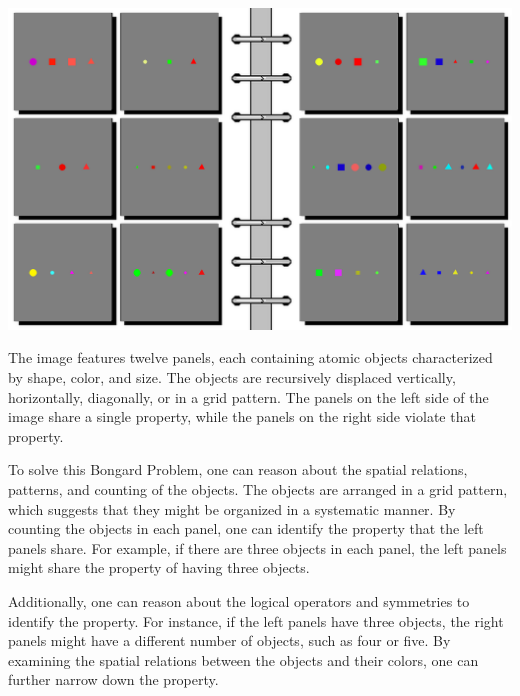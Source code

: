 \begin{tcolorbox}[breakable,enhanced jigsaw,opacityback=0,]
	\centering
	\includegraphics[width=.8\linewidth]{imgs/bongard/easy-10.png}\\
	\begin{dialogue}
		 The image features twelve panels, each containing atomic objects characterized by shape, color, and size. The objects are recursively displaced vertically, horizontally, diagonally, or in a grid pattern. The panels on the left side of the image share a single property, while the panels on the right side violate that property.
		
		To solve this Bongard Problem, one can reason about the spatial relations, patterns, and counting of the objects. The objects are arranged in a grid pattern, which suggests that they might be organized in a systematic manner. By counting the objects in each panel, one can identify the property that the left panels share. For example, if there are three objects in each panel, the left panels might share the property of having three objects.
		
		Additionally, one can reason about the logical operators and symmetries to identify the property. For instance, if the left panels have three objects, the right panels might have a different number of objects, such as four or five. By examining the spatial relations between the objects and their colors, one can further narrow down the property.
		

\end{dialogue}
\end{tcolorbox}
